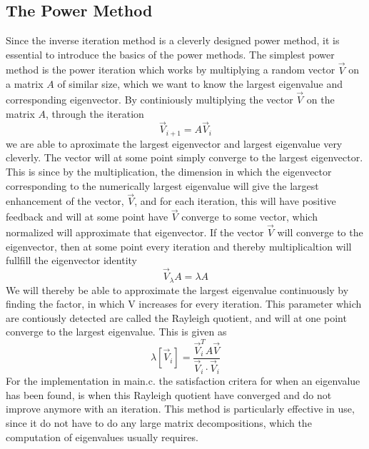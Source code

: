 \documentclass[twocolumn]{article}
\begin{document}
\subsection{\label{sec:1}The Power Method}
Since the inverse iteration method is a cleverly designed power method, it is essential to introduce the basics of the power methods. The simplest power method is the power iteration which works by multiplying a random vector $\vec{V}$ on a matrix $A$ of similar size, which we want to know the largest eigenvalue and corresponding eigenvector. By continiously multiplying the vector $\vec{V}$ on the matrix $A$, through the iteration
\begin{equation}
\vec{V}_{i+1} = A \vec{V}_i \label{eq:1}
\end{equation}
we are able to aproximate the largest eigenvector and largest eigenvalue very cleverly. The vector will at some point simply converge to the largest eigenvector. This is since by the multiplication, the dimension in which the eigenvector corresponding to the numerically largest eigenvalue will give the largest enhancement of the vector, $\vec{V}$, and for each iteration, this will have positive feedback and will at some point have $\vec{V}$ converge to some vector, which normalized will approximate that eigenvector. If the vector $\vec{V}$ will converge to the eigenvector, then at some point every iteration and thereby multiplicaltion will fullfill the eigenvector identity
\begin{equation}
\vec{V}_\lambda A = \lambda A
\end{equation}
We will thereby be able to approximate the largest eigenvalue continuously by finding the factor, in which V increases for every iteration. This parameter which are contiously detected are called the Rayleigh quotient, and will at one point converge to the largest eigenvalue. This is given as
\begin{equation}
\lambda \left[ \vec{V}_i \right] = \frac{\vec{V}^T_i A \vec{V}}{\vec{V}_i \cdot \vec{V}_i}
\end{equation}
For the implementation in main.c. the satisfaction critera for when an eigenvalue has been found, is when this Rayleigh quotient have converged and do not improve anymore with an iteration. This method is particularly effective in use, since it do not have to do any large matrix decompositions, which the computation of eigenvalues usually requires. 
\end{document}
